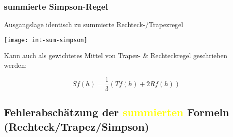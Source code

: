 \subsubsection{summierte Simpson-Regel}

Ausgangslage identisch zu summierte Rechteck-/Trapezregel

\begin{center}
	\texttt{[image: int-sum-simpson]}
\end{center}


Kann auch als gewichtetes Mittel von Trapez- \& Rechteckregel geschrieben werden:

$$Sf(h) = \frac{1}{3}(Tf(h) + 2Rf(h))$$





\subsection{Fehlerabschätzung der \textcolor{yellow}{summierten} Formeln 
(Rechteck/Trapez/Simpson)}


